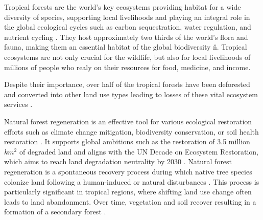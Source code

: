 Tropical forests are the world's key ecosystems providing habitat for a wide  diversity of species, supporting local livelihoods and playing an integral role in the global ecological cycles  such as carbon sequestration, water regulation, and nutrient cycling \citep{bormaCarbonContributionsSouth2022}. They host approximately two thirds of the world's flora and fauna, making them an essential habitat of the global biodiversity ň. Tropical ecosystems are not only crucial for the wildlife, but also for local livelihoods of millions of people who realy on their resources for food, medicine, and income.

Despite their importance, over half of the tropical forests have been deforested and converted into other land use types leading to losses of these vital ecosystem services \citep{chazdonNaturalRegenerationTool2016}. 

Natural forest regeneration is an effective tool for various ecological restoration efforts such as climate change mitigation, biodiversity conservation, or soil health restoration \citep{hordijkLandUseHistory2024}. %
It supports global ambitions such as the restoration of 3.5 million $km^2$ of degraded land \citep{holl2017restoring} and aligns with the UN Decade on Ecosystem Restoration, which aims to reach land degradation neutrality by 2030 \citep{waltham2020decade}. Natural forest regeneration is a spontaneous recovery process during which native tree species colonize land following a human-induced or natural disturbances \citep{crouzeillesEcologicalRestorationSuccess2017}. This process is particularly significant in tropical regions, where shifting land use change often leads to land abandonment. Over time, vegetation and soil recover resulting in a formation of a secondary forest \citep{chazdonSecondGrowthPromise2014}.




